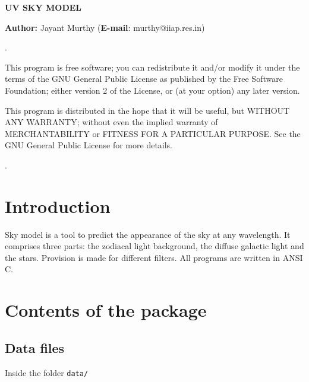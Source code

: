 \documentclass[12pt]{article}
\begin{document}
\centerline{\LARGE\bf UV SKY MODEL}


\begin{center}
\textbf{Author: }Jayant Murthy ({\bf E-mail}: murthy@iiap.res.in)\\
\end{center}


.\hrulefill

This program is free software; you can redistribute it and/or modify it under the terms of
the GNU General Public License as published by the Free Software Foundation; either version 2
of the License, or (at your option) any later version.

This program is distributed in the hope that it will be useful, but WITHOUT ANY WARRANTY;
without even the implied warranty of MERCHANTABILITY or FITNESS FOR A PARTICULAR PURPOSE.
See the GNU General Public License for more details.

.\hrulefill

\section{Introduction}

Sky model  is a tool to predict the appearance of the sky at any wavelength.
It comprises three parts: the zodiacal light background, the diffuse galactic
light and the stars. Provision is made for different filters. All programs are
written in ANSI C.


\section{Contents of the package}

\subsection{Data files}

Inside the folder {\tt data/}

\newenvironment{listing}{\begin{trivlist}\itemsep 0.02pt}{\end{trivlist}}
\end{document}
